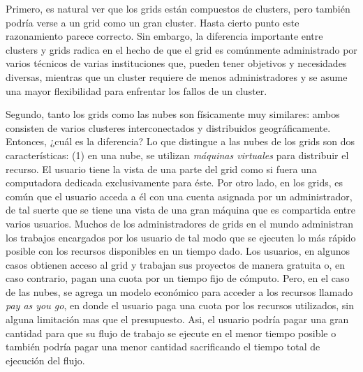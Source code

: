 Primero, es natural ver que los grids están compuestos de clusters, pero también podría verse a un grid como un gran cluster. Hasta cierto punto este razonamiento parece correcto. Sin embargo, la diferencia importante entre clusters y grids radica en el hecho de que el grid es comúnmente administrado por varios técnicos de varias instituciones que, pueden tener objetivos y necesidades diversas, mientras que un cluster requiere de menos administradores y se asume una mayor flexibilidad para enfrentar los fallos de un cluster.

Segundo, tanto los grids como las nubes son físicamente muy similares: ambos consisten de varios clusteres interconectados y distribuidos geográficamente. Entonces, ¿cuál es la diferencia? Lo que distingue a las nubes de los grids son dos características: (1) en una nube, se utilizan \emph{máquinas virtuales} para distribuir el recurso. El usuario tiene la vista de una parte del grid como si fuera una computadora dedicada exclusivamente para éste. Por otro lado, en los grids, es común que el usuario acceda a él con una cuenta asignada por un administrador, de tal suerte que se tiene una vista de una gran máquina que es compartida entre varios usuarios. Muchos de los administradores de grids en el mundo administran los trabajos encargados por los usuario de tal modo que se ejecuten lo más rápido posible con los recursos disponibles en un tiempo dado. Los usuarios, en algunos casos obtienen acceso al grid y trabajan sus proyectos de manera gratuita o, en caso contrario, pagan una cuota por un tiempo fijo de cómputo. Pero, en el caso de las nubes, se agrega un modelo económico para acceder a los recursos llamado \emph{pay as you go}, en donde el usuario paga una cuota por los recursos utilizados, sin alguna limitación mas que el presupuesto. Asi, el usuario podría pagar una gran cantidad para que su flujo de trabajo se ejecute en el menor tiempo posible o también podría pagar una menor cantidad sacrificando el tiempo total de ejecución del flujo.